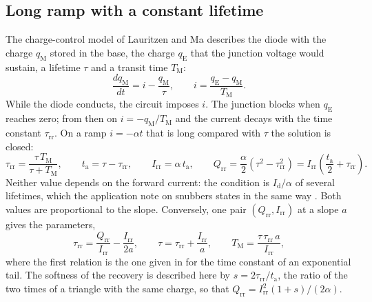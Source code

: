 \documentclass[10pt,a4paper]{scrartcl}
\newcommand{\Qrr}{Q_\mathrm{rr}}
\newcommand{\Irr}{I_\mathrm{rr}}
\newcommand{\Id}{I_\mathrm{d}}
\newcommand{\ta}{t_\mathrm{a}}
\newcommand{\trr}{\tau_\mathrm{rr}}
\newcommand{\TM}{T_\mathrm{M}}
\begin{document}
\subsection{Long ramp with a constant lifetime}
\label{sec:lm}
The charge-control model of Lauritzen and Ma \cite{lauritzen1991,ma1993} describes the diode with the charge $q_\mathrm{M}$ stored in the base, the charge $q_\mathrm{E}$ that the junction voltage would sustain, a lifetime $\tau$ and a transit time $\TM$:
\begin{equation}
\frac{dq_\mathrm{M}}{dt} = i - \frac{q_\mathrm{M}}{\tau}, \qquad i = \frac{q_\mathrm{E} - q_\mathrm{M}}{\TM} .
\label{eq:lm}
\end{equation}
While the diode conducts, the circuit imposes $i$. The junction blocks when $q_\mathrm{E}$ reaches zero; from then on $i = -q_\mathrm{M}/\TM$ and the current decays with the time constant $\trr$. On a ramp $i = -\alpha t$ that is long compared with $\tau$ the solution is closed:
\begin{equation}
\trr = \frac{\tau\,\TM}{\tau + \TM}, \qquad \ta = \tau - \trr, \qquad \Irr = \alpha\,\ta, \qquad \Qrr = \frac{\alpha}{2}\left(\tau^2 - \trr^2\right) = \Irr\left(\frac{\ta}{2} + \trr\right) .
\label{eq:longramp}
\end{equation}
Neither value depends on the forward current: the condition is $\Id/\alpha$ of several lifetimes, which the application note on snubbers states in the same way \cite[Sec.~2.1]{an6481}. Both values are proportional to the slope. Conversely, one pair $(\Qrr, \Irr)$ at a slope $a$ gives the parameters,
\begin{equation}
\trr = \frac{\Qrr}{\Irr} - \frac{\Irr}{2a}, \qquad \tau = \trr + \frac{\Irr}{a}, \qquad \TM = \frac{\tau\,\trr\,a}{\Irr} ,
\label{eq:lmfit}
\end{equation}
where the first relation is the one given in \cite[Eq.~(2)]{an6481} for the time constant of an exponential tail. The softness of the recovery is described here by $s = 2\trr/\ta$, the ratio of the two times of a triangle with the same charge, so that $\Qrr = \Irr^2 (1+s)/(2\alpha)$.
\end{document}
